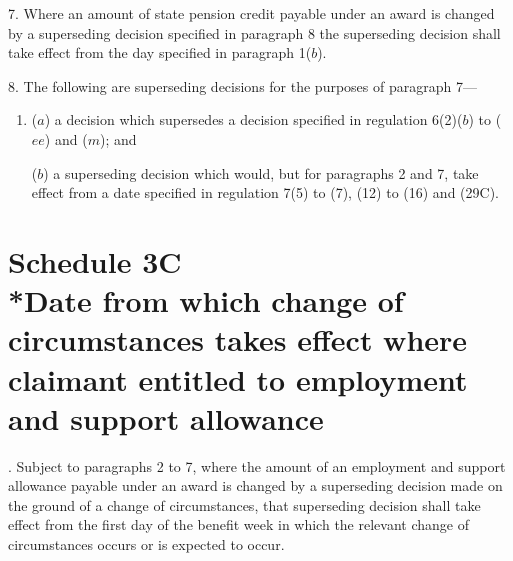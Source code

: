 \documentclass[12pt,a4paper]{article}
\begin{document}

\medskip

7.  Where an amount of state pension credit payable under an award is changed by a superseding decision specified in paragraph 8 the superseding decision shall take effect from the day specified in paragraph 1($b$).


\medskip

8.  The following are superseding decisions for the purposes of paragraph 7—
\begin{enumerate}\item[]
($a$) a decision which supersedes a decision specified in regulation 6(2)($b$)  to ($ee$)  and ($m$); and

($b$) a superseding decision which would, but for paragraphs 2 and 7, take effect from a date specified in regulation 7(5) to (7), (12) to (16) and (29C).
\end{enumerate}



\part[Schedule 3C --- Date from which change of circumstances takes effect where claimant entitled to employment and support allowance]{Schedule 3C\\*Date from which change of circumstances takes effect where claimant entitled to employment and support allowance}

\renewcommand\parthead{--- Schedule 3C}


\medskip

.  Subject to paragraphs 2 to 7, where the amount of an employment and support allowance payable under an award is changed by a superseding decision made on the ground of a change of circumstances, that superseding decision shall take effect from the first day of the benefit week in which the relevant change of circumstances occurs or is expected to occur.
\end{document}
